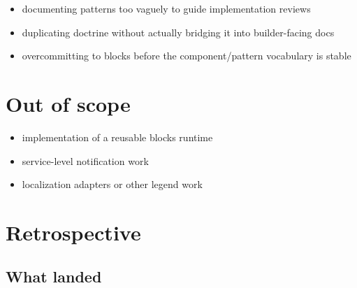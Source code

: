 \begin{itemize}
\tightlist
\item
  documenting patterns too vaguely to guide implementation reviews
\item
  duplicating doctrine without actually bridging it into builder-facing docs
\item
  overcommitting to blocks before the component/pattern vocabulary is stable
\end{itemize}

\section{Out of scope}\label{record-169-out-of-scope}

\begin{itemize}
\tightlist
\item
  implementation of a reusable blocks runtime
\item
  service-level notification work
\item
  localization adapters or other legend work
\end{itemize}

\section{Retrospective}\label{record-169-retrospective}

\subsection{What landed}\label{record-169-what-landed}


